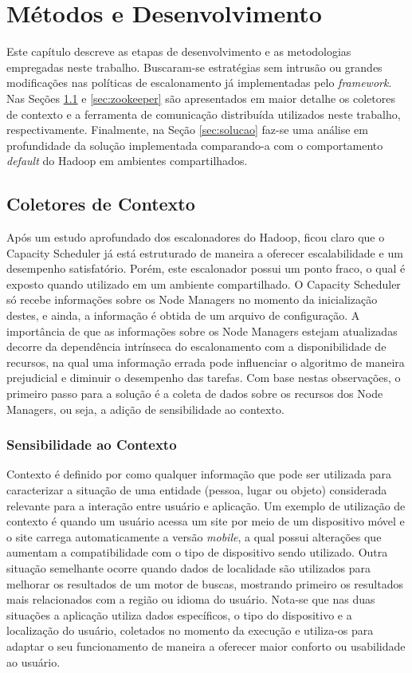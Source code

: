 \chapter{Métodos e Desenvolvimento}
\label{cap:desen}
Este capítulo descreve as etapas de desenvolvimento e as metodologias empregadas neste trabalho. Buscaram-se estratégias sem intrusão ou grandes modificações nas políticas de escalonamento já implementadas pelo \textit{framework}. Nas Seções \ref{sec:collector} e \ref{sec:zookeeper} são apresentados em maior detalhe os coletores de contexto e a ferramenta de comunicação distribuída utilizados neste trabalho, respectivamente. Finalmente, na Seção \ref{sec:solucao} faz-se uma análise em profundidade da solução implementada comparando-a com o comportamento \textit{default} do Hadoop em ambientes compartilhados.

\section{Coletores de Contexto}
\label{sec:collector}
Após um estudo aprofundado dos escalonadores do Hadoop, ficou claro que o Capacity Scheduler já está estruturado de maneira a oferecer escalabilidade e um desempenho satisfatório. Porém, este escalonador possui um ponto fraco, o qual é exposto quando utilizado em um ambiente compartilhado. O Capacity Scheduler só recebe informações sobre os Node Managers no momento da inicialização destes, e ainda, a informação é obtida de um arquivo de configuração. A importância de que as informações sobre os Node Managers estejam atualizadas decorre da dependência intrínseca do escalonamento com a disponibilidade de recursos, na qual uma informação errada pode influenciar o algoritmo de maneira prejudicial e diminuir o desempenho das tarefas. Com base nestas observações, o primeiro passo para a solução é a coleta de dados sobre os recursos dos Node Managers, ou seja, a adição de sensibilidade ao contexto.

\subsection{Sensibilidade ao Contexto}
\label{sec:ctx}
Contexto é definido por \citet{Dey} como qualquer informação que pode ser utilizada para caracterizar a situação de uma entidade (pessoa, lugar ou objeto) considerada relevante para a interação entre usuário e aplicação. Um exemplo de utilização de contexto é quando um usuário acessa um site por meio de um dispositivo móvel e o site carrega automaticamente a versão \textit{mobile}, a qual possui alterações que aumentam a compatibilidade com o tipo de dispositivo sendo utilizado. Outra situação semelhante ocorre quando dados de localidade são utilizados para melhorar os resultados de um motor de buscas, mostrando primeiro os resultados mais relacionados com a região ou idioma do usuário. Nota-se que nas duas situações a aplicação utiliza dados específicos, o tipo do dispositivo e a localização do usuário, coletados no momento da execução e utiliza-os para adaptar o seu funcionamento de maneira a oferecer maior conforto ou usabilidade ao usuário. 

